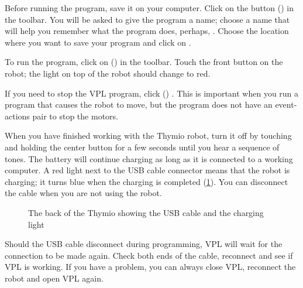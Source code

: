 
Before running the program, save it on your computer. Click on the
button  () in the toolbar. You will be asked to
give the program a name; choose a name that will help you remember what
the program does, perhaps, . Choose the location where
you want to save your program and click on .





To run the program, click on  () in the toolbar.
Touch the front button on the robot; the light on top of the robot
should change to red.


If you need to stop the VPL program, click  () .
This is important when you run a program that causes the robot to move,
but the program does not have an event-actions pair to stop the motors.


When you have finished working with the Thymio robot, turn it
off by touching and holding the center button for a few seconds until
you hear a sequence of tones. The battery will
continue charging as long as it is connected to a working computer. A
red light next to the USB cable connector means that the robot is
charging; it turns blue when the charging is completed (\cref{fig.back}).
You can disconnect the cable when you are not using the robot.


\begin{figure}
\begin{center}
\caption{The back of the Thymio showing the USB cable and the
 charging light}\label{fig.back}
\end{center}
\end{figure}

Should the USB cable disconnect during programming, VPL will wait for
the connection to be made again. Check both ends of the cable, reconnect
and see if VPL is working. If you have a problem, you can always close
VPL, reconnect the robot and open VPL again.

